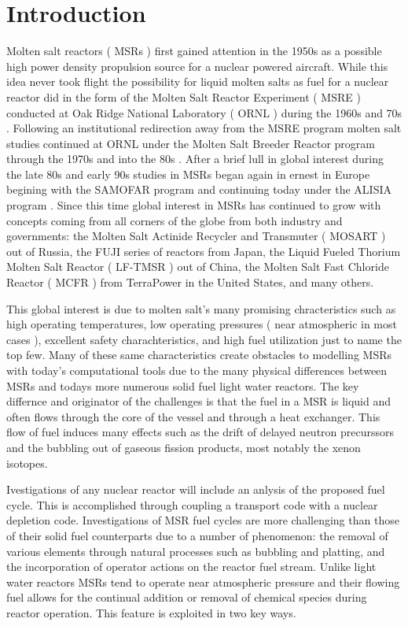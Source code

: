 \chapter{Introduction}\label{ch:intro}

Molten salt reactors ( MSRs ) first gained attention in the 1950s as a possible
high power density propulsion source for a nuclear powered aircraft. While this
idea never took flight the possibility for liquid molten salts as fuel for a
nuclear reactor did in the form of the Molten Salt Reactor Experiment ( MSRE )
conducted at Oak Ridge National Laboratory ( ORNL ) during the 1960s and 70s 
\cite{ORNL-MSRE}. Following an institutional redirection away from the MSRE
program molten salt studies continued at ORNL under the Molten Salt Breeder
Reactor program through the 1970s and into the 80s \cite{ORNL-MSBR}. After a
brief lull in global interest during the late 80s and early 90s studies in MSRs
began again in ernest in Europe begining with the SAMOFAR program and continuing
today under the ALISIA program \cite{SAMOFAR}. Since this time global interest
in MSRs has continued to grow with concepts coming from all corners of the
globe from both industry and governments: the Molten Salt Actinide Recycler and
Transmuter ( MOSART ) out of Russia, the FUJI series of reactors from Japan, 
the Liquid Fueled Thorium Molten Salt Reactor ( LF-TMSR ) out of China, the
Molten Salt Fast Chloride Reactor ( MCFR ) from TerraPower in the United States,
and many others.

This global interest is due to molten salt's many promising chracteristics such
as high operating temperatures, low operating pressures ( near atmospheric in
most cases ), excellent safety charachteristics, and high fuel utilization just
to name the top few. Many of these same characteristics create obstacles to 
modelling MSRs with today's computational tools due to the many physical
differences between MSRs and todays more numerous solid fuel light water
reactors. The key differnce and originator of the challenges is that the fuel
in a MSR is liquid and often flows through the core of the vessel and through
a heat exchanger. This flow of fuel induces many effects such as the drift of
delayed neutron precurssors and the bubbling out of gaseous fission products,
most notably the xenon isotopes.

Ivestigations of any nuclear reactor will include an anlysis of the proposed
fuel cycle. This is accomplished through coupling a transport code with a
nuclear depletion code. Investigations of MSR fuel cycles are more challenging
than those of their solid fuel counterparts due to a number of phenomenon: the
removal of various elements through natural processes such as bubbling and
platting, and the incorporation of operator actions on the reactor fuel stream.
Unlike light water reactors MSRs tend to operate near atmospheric pressure and
their flowing fuel allows for the continual addition or removal of chemical
species during reactor operation. This feature is exploited in two key ways.

